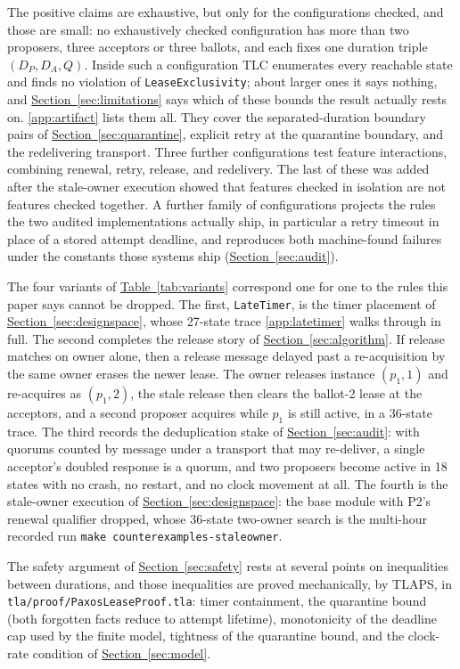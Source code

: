 \documentclass[final,5p,times,twocolumn,number]{elsarticle}
\newcommand{\code}[1]{\texttt{#1}}
\newcommand{\secref}[1]{\hyperref[#1]{Section~\ref*{#1}}}
\newcommand{\tabref}[1]{\hyperref[#1]{Table~\ref*{#1}}}
\begin{document}
The positive claims are exhaustive, but only for the configurations checked, and those are small: no exhaustively checked configuration has more than two proposers, three acceptors or three ballots, and each fixes one duration triple $(D_P, D_A, Q)$.  Inside such a configuration TLC enumerates every reachable state and finds no violation of \code{LeaseExclusivity}; about larger ones it says nothing, and \secref{sec:limitations} says which of these bounds the result actually rests on.  \ref{app:artifact} lists them all.  They cover the separated-duration boundary pairs of \secref{sec:quarantine}, explicit retry at the quarantine boundary, and the redelivering transport.  Three further configurations test feature interactions, combining renewal, retry, release, and redelivery.  The last of these was added after the stale-owner execution showed that features checked in isolation are not features checked together.  A further family of configurations projects the rules the two audited implementations actually ship, in particular a retry timeout in place of a stored attempt deadline, and reproduces both machine-found failures under the constants those systems ship (\secref{sec:audit}).

The four variants of \tabref{tab:variants} correspond one for one to the rules this paper says cannot be dropped.  The first, \code{LateTimer}, is the timer placement of \secref{sec:designspace}, whose 27-state trace \ref{app:latetimer} walks through in full.  The second completes the release story of \secref{sec:algorithm}.  If release matches on owner alone, then a release message delayed past a re-acquisition by the same owner erases the newer lease.  The owner releases instance $(p_1, 1)$ and re-acquires as $(p_1, 2)$, the stale release then clears the ballot-2 lease at the acceptors, and a second proposer acquires while $p_1$ is still active, in a 36-state trace.  The third records the deduplication stake of \secref{sec:audit}: with quorums counted by message under a transport that may re-deliver, a single acceptor's doubled response is a quorum, and two proposers become active in 18 states with no crash, no restart, and no clock movement at all.  The fourth is the stale-owner execution of \secref{sec:designspace}: the base module with P2's renewal qualifier dropped, whose 36-state two-owner search is the multi-hour recorded run \code{make counterexamples-staleowner}.

The safety argument of \secref{sec:safety} rests at several points on inequalities between durations, and those inequalities are proved mechanically, by TLAPS, in \code{tla/proof/PaxosLeaseProof.tla}: timer containment, the quarantine bound (both forgotten facts reduce to attempt lifetime), monotonicity of the deadline cap used by the finite model, tightness of the quarantine bound, and the clock-rate condition of \secref{sec:model}.
\end{document}
